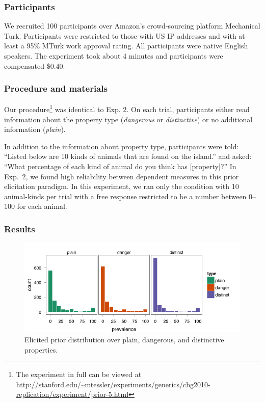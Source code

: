 \documentclass[10pt,letterpaper]{article}
\begin{document}
\subsubsection{Participants}

We recruited 100 participants over Amazon's crowd-sourcing platform Mechanical Turk. Participants were restricted to those with US IP addresses and with at least a 95\% MTurk work approval rating. All participants were native English speakers. The experiment took about 4 minutes and participants were compensated \$0.40.

\subsubsection{Procedure and materials}

Our procedure\footnote{The experiment in full can be viewed at \url{http://stanford.edu/~mtessler/experiments/generics/cbg2010-replication/experiment/prior-5.html}} was identical to Exp. 2. On each trial, participants either read information about the property type (\emph{dangerous} or \emph{distinctive}) or no additional information (\emph{plain}). 

In addition to the information about property type, participants were told: ``Listed below are 10 kinds of animals that are found on the island.'' and asked: ``What percentage of each kind of animal do you think has [property]?'' In Exp.~2, we found high reliability between dependent measures in this prior elicitation paradigm. In this experiment, we ran only the condition with 10 animal-kinds per trial with a free response restricted to be a number between 0--100 for each animal.

\subsubsection{Results}

\begin{figure}
\centering
    \includegraphics[width=0.8\columnwidth]{prior_ddp}
    \caption{Elicited prior distribution over plain, dangerous, and distinctive properties.}
  \label{fig:empiricalddp}
\end{figure}
\end{document}
